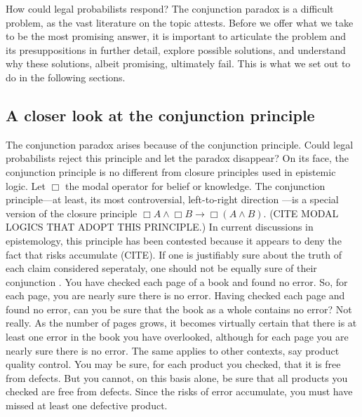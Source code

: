 \documentclass[10pt,dvipsnames,enabledeprecatedfontcommands]{scrartcl}
\newcommand{\et}{\wedge}
\begin{document}
How could legal probabilists respond? The conjunction paradox is a
difficult problem, as the vast literature on the topic attests. Before
we offer what we take to be the most promising answer, it is important
to articulate the problem
 and
its presuppositions in further detail, explore possible solutions, and
understand why these solutions, albeit promising, ultimately fail. This
is what we set out to do in the following sections.

\subsection{A closer look at the conjunction
principle}\label{a-closer-look-at-the-conjunction-principle}

The conjunction paradox arises because of the conjunction principle.
Could legal probabilists reject this principle and let the paradox
disappear? On its face, the conjunction principle is no different from
closure principles used in epistemic logic. Let \(\Box\) the modal
operator for belief or knowledge. The conjunction principle---at least,
its most controversial, left-to-right direction
---is a special version of the closure principle
\(\Box A \wedge \Box B \rightarrow \Box (A \et B)\). (CITE MODAL LOGICS
THAT ADOPT THIS PRINCIPLE.) 
In current discussions in epistemology, this principle has been
contested because it appears to deny the fact that risks accumulate
(CITE).
If one is justifiably sure about the truth of each claim considered
seperataly, one should not be equally sure of their conjunction
. You have
checked each page of a book and found no error. So, for each page, you
are nearly sure there is no error. Having checked each page and found no
error, can you be sure that the book as a whole contains no error? Not
really. As the number of pages grows, it becomes virtually certain that
there is at least one error in the book you have overlooked, although
for each page you are nearly sure there is no error. The same applies to
other contexts, say product quality control. You may be sure, for each
product you checked, that it is free from defects. But you cannot, on
this basis alone, be sure that all products you checked are free from
defects. Since the risks of error accumulate, you must have missed at
least one defective product.
\end{document}
